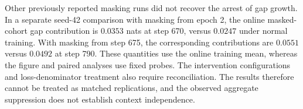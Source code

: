 Other previously reported masking runs did not recover the arrest of gap growth. In a separate seed-42 comparison with masking from epoch 2, the online masked-cohort gap contribution is $0.0353$ nats at step 670, versus $0.0247$ under normal training. With masking from step 675, the corresponding contributions are $0.0551$ versus $0.0492$ at step 790. These quantities use the online training mean, whereas the figure and paired analyses use fixed probes. The intervention configurations and loss-denominator treatment also require reconciliation. The results therefore cannot be treated as matched replications, and the observed aggregate suppression does not establish context independence.

